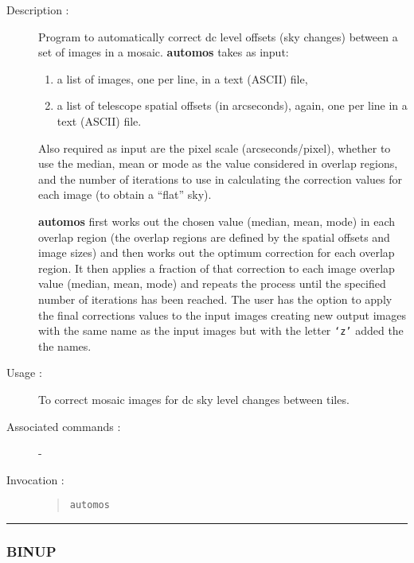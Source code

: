 \begin{description}

\item[Description :] Program to automatically correct dc level offsets
(sky changes) between a set of images in a mosaic.  {\bf automos} takes as
input:

\begin{enumerate} 

\item a list of images, one per line, in a text (ASCII) file, 

\item a list of telescope spatial offsets (in arcseconds), again,
one per line in a text (ASCII) file.

\end{enumerate}

Also required as input are the pixel scale (arcseconds/pixel), whether
to use the median, mean or mode as the value considered in overlap
regions, and the number of iterations to use in calculating the
correction values for each image (to obtain a ``flat'' sky).

{\bf automos} first works out the chosen value (median, mean,
mode) in each overlap region (the overlap regions are defined by the
spatial offsets and image sizes) and then works out the optimum
correction for each overlap region. It then applies a fraction of that
correction to each image overlap value (median, mean, mode) and repeats
the process until the specified number of iterations has been reached.
The user has the option to apply the final corrections values to the
input images creating new output images with the same name as the input
images but with the letter {\tt `z'} added the the names.

\item[Usage :] To correct mosaic images for dc sky level changes between
tiles.
\item[Associated commands :] -
\item[Invocation :]

\begin{quote}{\tt automos }\end{quote}

\end{description}

\hrule 
\subsubsection*{\label{BINUP}BINUP}

